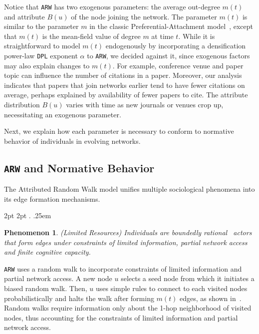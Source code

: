 Notice that \texttt{ARW} has two exogenous parameters: the average out-degree
$m(t)$ and attribute $B(u)$ of the node joining the network. The parameter
$m(t)$ is similar to the parameter $m$ in the classic Preferential-Attachment
model~\cite{barabasi1999emergence}, except that $m(t)$ is the mean-field value
of degree $m$ at time $t$. While it is straightforward to model $m(t)$
endogenously by incorporating a densification power-law \texttt{DPL} exponent
$\alpha$ to \texttt{ARW}, we decided against it, since exogenous factors may
also explain changes to $m(t)$. For example, conference venue and paper topic can
influence the number of citations in a paper. Moreover, our analysis indicates
that papers that join networks earlier tend to have fewer citations on average,
perhaps explained by availability of {fewer} papers to cite. The attribute distribution
$B(u)$ varies with time as new journals or venues crop up, necessitating an exogenous
parameter.

Next, we explain how each parameter is necessary to conform to normative
behavior of individuals in evolving networks.

\subsection{\texttt{ARW} and Normative Behavior}
\label{sub:Model Interpretation}

The Attributed Random Walk model unifies multiple sociological phenomena
into its edge formation mechanisms.

  {2pt} %
  {2pt} %
  {\itshape} %
  {} %
  {\bfseries} %
  {.} %
  {.25em} %
  {} %

\theoremstyle{exampstyle} \newtheorem{ph}{Phenomenon}

\begin{ph}
	(Limited Resources) Individuals are boundedly rational~\cite{simon1972theories,gigerenzer1996reasoning,lipman1995information}
	actors that form edges under constraints of limited information, partial network access and finite cognitive capacity.
\end{ph}
\texttt{ARW} uses a random walk to incorporate constraints of limited information
and partial network access. A new node $u$ selects a seed node from which it
initiates a biased random walk. Then, $u$ uses simple rules to connect to each visited
nodes probabilistically and halts the walk after forming $m(t)$ edges, as shown in~. Random walks require information only about the
1-hop neighborhood of visited nodes, thus accounting for  the constraints of limited information and partial network access.

